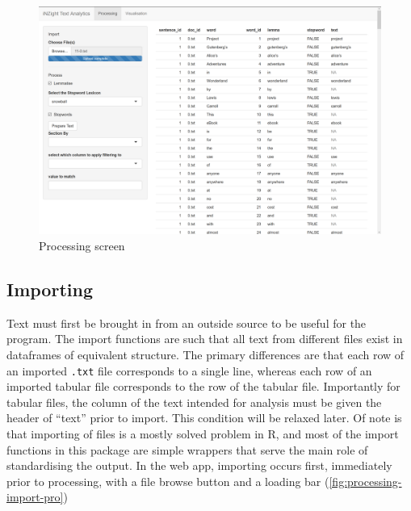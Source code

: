 \documentclass[11pt, a4paper, twoside, titlepage]{report}
\begin{document}
\begin{figure}
\centering
\includegraphics[scale=0.35]{processing-overview.png}
\caption{Processing screen\label{fig:processing-overview}}
\end{figure}

\subsection{Importing}\label{sec:importing}

Text must first be brought in from an outside source to be useful for
the program. The import functions are such that all text from
different files exist in dataframes of equivalent structure. The
primary differences are that each row of an imported \texttt{.txt}
file corresponds to a single line, whereas each row of an imported
tabular file corresponds to the row of the tabular file. Importantly
for tabular files, the column of the text intended for analysis must
be given the header of ``text'' prior to import. This condition will
be relaxed later. Of note is that importing of files is a mostly
solved problem in R, and most of the import functions in this package
are simple wrappers that serve the main role of standardising the
output. In the web app, importing occurs first, immediately prior to
processing, with a file browse button and a loading bar
(\cref{fig:processing-import-pro})
\end{document}
